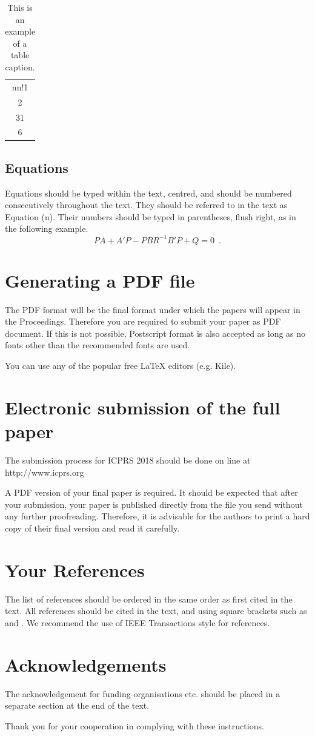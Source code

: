 \documentclass[10pt]{article}
\begin{document}
\begin{table}[h]
\begin{center}

\begin{tabular}{c}
nn!1 \\
2 \\
31 \\
6 \\
\end{tabular}
\end{center}
\caption{\label{tab1}This is an example of a table caption.}
\end{table}

\subsection{Equations}
Equations should be typed within the text, centred, and should
be numbered consecutively throughout the text. They should
be referred to in the text as Equation (n). Their numbers
should be typed in parentheses, flush right, as in the following
example.
\begin{equation}
	    PA + A'P - PBR^{-1}B'P + Q  =  0 \enspace.
\end{equation}

\section{Generating a {PDF} file}
The PDF format will be the final format under which the
papers will appear in the Proceedings. Therefore you are
required to submit your paper as PDF document. If this is not
possible, Postscript format is also accepted as long as no fonts
other than the recommended fonts are used.

You can use any of the popular free LaTeX editors (e.g. Kile).

\section{Electronic submission of the full paper}
The submission process for ICPRS 2018 should be done on
line at http://www.icprs.org

A PDF version of your final paper is required. It should
be expected that after your submission, your paper is
published directly from the file you send without any further
proofreading. Therefore, it is advisable for the authors to
print a hard copy of their final version and read it carefully.

\section{Your References}
The list of references should be ordered in the same order as
first cited in the text. All references should be cited in the
text, and using square brackets such as \cite{ref01} and \cite{ref01,ref02}. We
recommend the use of IEEE Transactions style for references.

\section*{Acknowledgements}
The acknowledgement for funding organisations etc. should
be placed in a separate section at the end of the text.



Thank you for your cooperation in complying with these
instructions.



\end{document}

